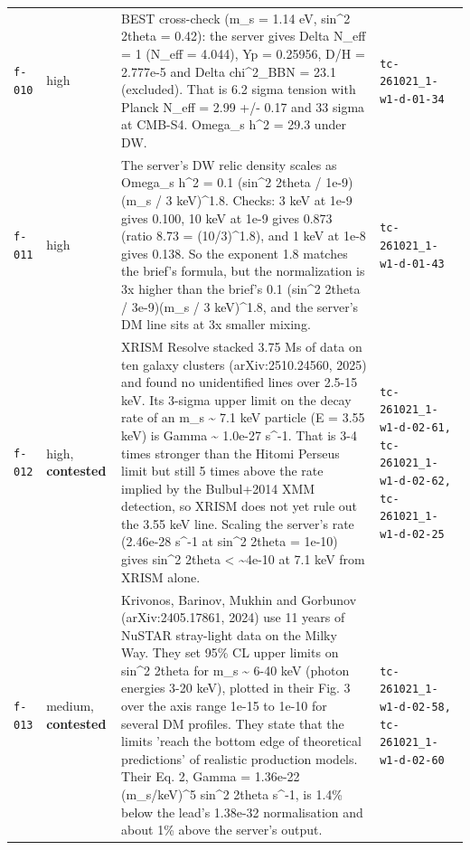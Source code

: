 \documentclass[11pt,a4paper]{article}
\begin{document}
\begin{longtable}{@{}p{}p{}p{}p{}@{}}
\texttt{f-010} & high & BEST cross-check (m\_s = 1.14 eV, sin\textasciicircum{}2 2theta = 0.42): the server gives Delta N\_eff = 1 (N\_eff = 4.044), Yp = 0.25956, D/H = 2.777e-5 and Delta chi\textasciicircum{}2\_BBN = 23.1 (excluded). That is 6.2 sigma tension with Planck N\_eff = 2.99 +/- 0.17 and 33 sigma at CMB-S4. Omega\_s h\textasciicircum{}2 = 29.3 under DW. & \texttt{tc-261021\_\allowbreak{}1-w1-d-01-34} \\
\texttt{f-011} & high & The server's DW relic density scales as Omega\_s h\textasciicircum{}2 = 0.1 (sin\textasciicircum{}2 2theta / 1e-9)(m\_s / 3 keV)\textasciicircum{}1.8. Checks: 3 keV at 1e-9 gives 0.100, 10 keV at 1e-9 gives 0.873 (ratio 8.73 = (10/3)\textasciicircum{}1.8), and 1 keV at 1e-8 gives 0.138. So the exponent 1.8 matches the brief's formula, but the normalization is 3x higher than the brief's 0.1 (sin\textasciicircum{}2 2theta / 3e-9)(m\_s / 3 keV)\textasciicircum{}1.8, and the server's DM line sits at 3x smaller mixing. & \texttt{tc-261021\_\allowbreak{}1-w1-d-01-43} \\
\texttt{f-012} & high, \textbf{contested} & XRISM Resolve stacked 3.75 Ms of data on ten galaxy clusters (arXiv:2510.24560, 2025) and found no unidentified lines over 2.5-15 keV. Its 3-sigma upper limit on the decay rate of an m\_s \textasciitilde{} 7.1 keV particle (E = 3.55 keV) is Gamma \textasciitilde{} 1.0e-27 s\textasciicircum{}-1. That is 3-4 times stronger than the Hitomi Perseus limit but still 5 times above the rate implied by the Bulbul+2014 XMM detection, so XRISM does not yet rule out the 3.55 keV line. Scaling the server's rate (2.46e-28 s\textasciicircum{}-1 at sin\textasciicircum{}2 2theta = 1e-10) gives sin\textasciicircum{}2 2theta \textless{} \textasciitilde{}4e-10 at 7.1 keV from XRISM alone. & \texttt{tc-261021\_\allowbreak{}1-w1-d-02-61,\allowbreak{} tc-261021\_\allowbreak{}1-w1-d-02-62,\allowbreak{} tc-261021\_\allowbreak{}1-w1-d-02-25} \\
\texttt{f-013} & medium, \textbf{contested} & Krivonos, Barinov, Mukhin and Gorbunov (arXiv:2405.17861, 2024) use 11 years of NuSTAR stray-light data on the Milky Way. They set 95\% CL upper limits on sin\textasciicircum{}2 2theta for m\_s \textasciitilde{} 6-40 keV (photon energies 3-20 keV), plotted in their Fig. 3 over the axis range 1e-15 to 1e-10 for several DM profiles. They state that the limits 'reach the bottom edge of theoretical predictions' of realistic production models. Their Eq. 2, Gamma = 1.36e-22 (m\_s/keV)\textasciicircum{}5 sin\textasciicircum{}2 2theta s\textasciicircum{}-1, is 1.4\% below the lead's 1.38e-32 normalisation and about 1\% above the server's output. & \texttt{tc-261021\_\allowbreak{}1-w1-d-02-58,\allowbreak{} tc-261021\_\allowbreak{}1-w1-d-02-60} \\

\end{longtable}
\end{document}
